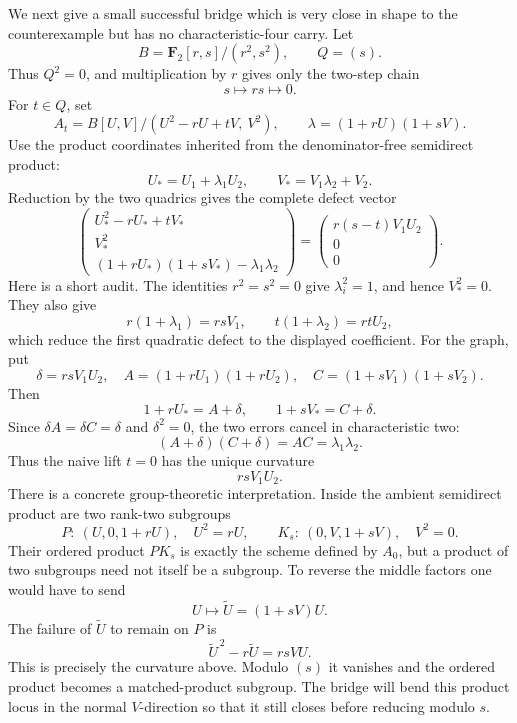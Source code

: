\documentclass[11pt]{amsart}
\theoremstyle{definition}
\theoremstyle{remark}
\newcommand{\F}{\mathbf F}
\begin{document}
We next give a small successful bridge which is very close in shape to
the counterexample but has no characteristic-four carry.  Let
\[
 B=\F_2[r,s]/(r^2,s^2),
 \qquad Q=(s).
\]
Thus \(Q^2=0\), and multiplication by \(r\) gives only the two-step chain
\[
 s\longmapsto rs\longmapsto0.
\]
For \(t\in Q\), set
\begin{equation}\label{eq:toy-bridge-algebra}
 A_t
 =
 B[U,V]/(U^2-rU+tV,\ V^2),
 \qquad
 \lambda=(1+rU)(1+sV).
\end{equation}
Use the product coordinates inherited from the denominator-free
semidirect product:
\[
 U_*=U_1+\lambda_1U_2,
 \qquad
 V_*=V_1\lambda_2+V_2.
\]
Reduction by the two quadrics gives the complete defect vector
\begin{equation}\label{eq:toy-bridge-defect}
 \begin{pmatrix}
  U_*^2-rU_*+tV_*\\
  V_*^2\\
  (1+rU_*)(1+sV_*)-\lambda_1\lambda_2
 \end{pmatrix}
 =
 \begin{pmatrix}
  r(s-t)V_1U_2\\0\\0
 \end{pmatrix}.
\end{equation}
Here is a short audit.  The identities \(r^2=s^2=0\) give
\(\lambda_i^2=1\), and hence \(V_*^2=0\).  They also give
\[
 r(1+\lambda_1)=rsV_1,\qquad
 t(1+\lambda_2)=rtU_2,
\]
which reduce the first quadratic defect to the displayed coefficient.
For the graph, put
\[
 \delta=rsV_1U_2,\quad
 A=(1+rU_1)(1+rU_2),\quad
 C=(1+sV_1)(1+sV_2).
\]
Then
\[
 1+rU_*=A+\delta,\qquad 1+sV_*=C+\delta.
\]
Since \(\delta A=\delta C=\delta\) and \(\delta^2=0\), the two errors
cancel in characteristic two:
\[
 (A+\delta)(C+\delta)=AC=\lambda_1\lambda_2.
\]
Thus the naive lift \(t=0\) has the unique curvature
\[
 rsV_1U_2.
\]
There is a concrete group-theoretic interpretation.  Inside the ambient
semidirect product are two rank-two subgroups
\[
 P:\ (U,0,1+rU),\quad U^2=rU,
 \qquad
 K_s:\ (0,V,1+sV),\quad V^2=0.
\]
Their ordered product \(P K_s\) is exactly the scheme defined by
\(A_0\), but a product of two subgroups need not itself be a subgroup.
To reverse the middle factors one would have to send
\[
 U\longmapsto\widetilde U=(1+sV)U.
\]
The failure of \(\widetilde U\) to remain on \(P\) is
\[
 \widetilde U^{\,2}-r\widetilde U=rsVU.
\]
This is precisely the curvature above.  Modulo \((s)\) it vanishes and
the ordered product becomes a matched-product subgroup.  The bridge
will bend this product locus in the normal \(V\)-direction so that it
still closes before reducing modulo \(s\).
\end{document}

